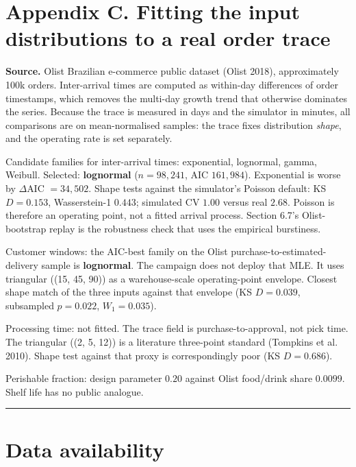 \documentclass[review,3p,times]{elsarticle}
\theoremstyle{definition}
\begin{document}
\section{Appendix C. Fitting the input distributions to a real order
trace}\label{appendix-c.-fitting-the-input-distributions-to-a-real-order-trace}

\textbf{Source.} Olist Brazilian e-commerce public dataset (Olist 2018),
approximately 100k orders. Inter-arrival times are computed as
within-day differences of order timestamps, which removes the multi-day
growth trend that otherwise dominates the series. Because the trace is
measured in days and the simulator in minutes, all comparisons are on
mean-normalised samples: the trace fixes distribution \emph{shape}, and
the operating rate is set separately.

Candidate families for inter-arrival times: exponential, lognormal,
gamma, Weibull. Selected: \textbf{lognormal} (\(n=98{,}241\), AIC
\(161{,}984\)). Exponential is worse by \(\Delta\)AIC \(=34{,}502\).
Shape tests against the simulator's Poisson default: KS \(D=0.153\),
Wasserstein-1 \(0.443\); simulated CV \(1.00\) versus real \(2.68\).
Poisson is therefore an operating point, not a fitted arrival process.
Section 6.7's Olist-bootstrap replay is the robustness check that uses
the empirical burstiness.

Customer windows: the AIC-best family on the Olist
purchase-to-estimated-delivery sample is \textbf{lognormal}. The
campaign does not deploy that MLE. It uses triangular ((15, 45, 90)) as
a warehouse-scale operating-point envelope. Closest shape match of the
three inputs against that envelope (KS \(D=0.039\), subsampled
\(p=0.022\), \(W_1=0.035\)).

Processing time: not fitted. The trace field is purchase-to-approval,
not pick time. The triangular ((2, 5, 12)) is a literature three-point
standard (Tompkins et al. 2010). Shape test against that proxy is
correspondingly poor (KS \(D=0.686\)).

Perishable fraction: design parameter \(0.20\) against Olist food/drink
share \(0.0099\). Shelf life has no public analogue.

\begin{center}\rule{0.5\linewidth}{0.5pt}\end{center}

\section*{Data availability}
\end{document}
